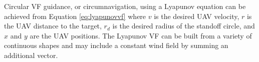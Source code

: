 \documentclass[conf]{new-aiaa}
\begin{document}
Circular VF guidance, or circumnavigation, using a Lyapunov equation can be achieved from Equation \ref{eq:lyapunovvf} where $v$ is the desired UAV velocity, $r$ is the UAV distance to the target, $r_d$ is the desired radius of the standoff circle, and $x$ and $y$ are the UAV positions. The Lyapunov VF can be built from a variety of continuous shapes and may include a constant wind field by summing an additional vector.
 



\end{document}
